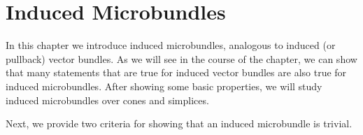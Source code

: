 \chapter{Induced Microbundles}\label{chapter::induced}
\begin{myparagraph}
    In this chapter we introduce induced microbundles,
    analogous to induced (or pullback) vector bundles.
    As we will see in the course of the chapter,
    we can show that many statements that are true for
    induced vector bundles are also true for induced microbundles.
    After showing some basic properties,
    we will study induced microbundles over cones and simplices.
\end{myparagraph}


\begin{myparagraph}
    Next, we provide two criteria for showing that an induced microbundle is trivial.
\end{myparagraph}




